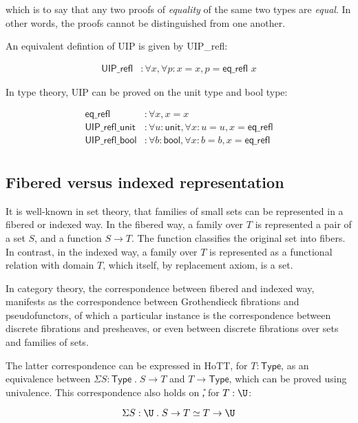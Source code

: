 \documentclass[10pt]{art.cls/art}
\newcommand{\Type}{\textsf{Type}}
\begin{document}
which is to say that any two proofs of \emph{equality} of the same two types are \emph{equal}. In other words, the proofs cannot be distinguished from one another.

An equivalent defintion of UIP is given by \textsf{UIP\_refl}:

\begin{align*}
  \textsf{UIP\_refl} & : \forall x, \forall p : x = x, p = \textsf{eq\_refl } x
\end{align*}

In type theory, UIP can be proved on the unit type and bool type:

\begin{align*}
  \textsf{eq\_refl}        & : \forall x, x = x                                                    \\
  \textsf{UIP\_refl\_unit} & : \forall u : \textsf{unit}, \forall x : u = u, x = \textsf{eq\_refl} \\
  \textsf{UIP\_refl\_bool} & : \forall b : \textsf{bool}, \forall x : b = b, x = \textsf{eq\_refl} \\
\end{align*}

\subsection{Fibered versus indexed representation}
It is well-known in set theory, that families of small sets can be represented in a fibered or indexed way. In the fibered way, a family over $T$ is represented a pair of a set $S$, and a function $S \rightarrow T$. The function classifies the original set into fibers. In contrast, in the indexed way, a family over $T$ is represented as a functional relation with domain $T$, which itself, by replacement axiom, is a set.

In category theory, the correspondence between fibered and indexed way, manifests as the correspondence between Grothendieck fibrations and pseudofunctors, of which a particular instance is the correspondence between discrete fibrations and presheaves, or even between discrete fibrations over sets and families of sets.

The latter correspondence can be expressed in HoTT, for $T: \Type$, as an equivalence between $\Sigma S: \Type\;.\;S \rightarrow T$ and $T \rightarrow \Type$, which can be proved using univalence. This correspondence also holds on \U, for $T: \U$:

\begin{equation*}
  \Sigma S: \U\;.\;S\rightarrow T \simeq T \rightarrow \U
\end{equation*}
\end{document}
